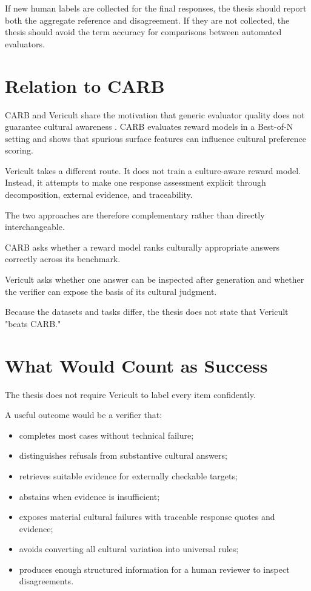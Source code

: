 If new human labels are collected for the final responses, the thesis should report both the aggregate reference and disagreement. If they are not collected, the thesis should avoid the term accuracy for comparisons between automated evaluators.

\section{Relation to CARB}

CARB and Vericult share the motivation that generic evaluator quality does not guarantee cultural awareness \parencite{zhang2025carb}. CARB evaluates reward models in a Best-of-N setting and shows that spurious surface features can influence cultural preference scoring.

Vericult takes a different route. It does not train a culture-aware reward model. Instead, it attempts to make one response assessment explicit through decomposition, external evidence, and traceability.

The two approaches are therefore complementary rather than directly interchangeable.

CARB asks whether a reward model ranks culturally appropriate answers correctly across its benchmark.

Vericult asks whether one answer can be inspected after generation and whether the verifier can expose the basis of its cultural judgment.

Because the datasets and tasks differ, the thesis does not state that Vericult "beats CARB."

\section{What Would Count as Success}

The thesis does not require Vericult to label every item confidently.

A useful outcome would be a verifier that:

\begin{itemize}
\item completes most cases without technical failure;
\item distinguishes refusals from substantive cultural answers;
\item retrieves suitable evidence for externally checkable targets;
\item abstains when evidence is insufficient;
\item exposes material cultural failures with traceable response quotes and evidence;
\item avoids converting all cultural variation into universal rules;
\item produces enough structured information for a human reviewer to inspect disagreements.
\end{itemize}

